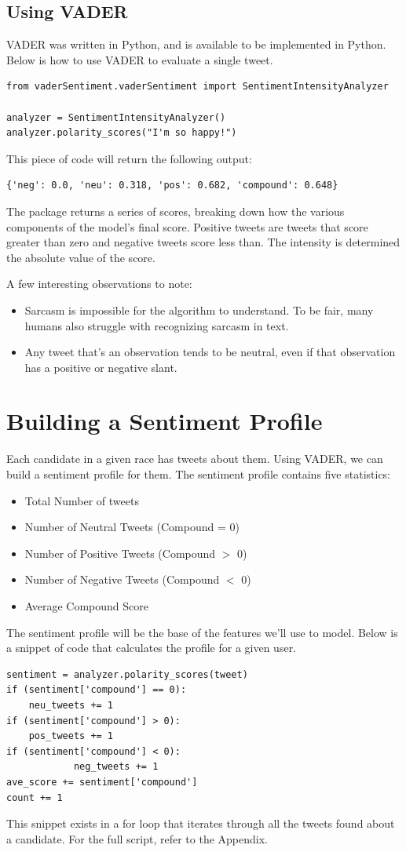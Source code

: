 \documentclass[11pt, twoside, reqno]{book}
\begin{document}
\subsection{Using VADER}
\hspace{0.2in}VADER was written in Python, and is available to be implemented in Python. Below is how to use VADER to evaluate a single tweet. 
\begin{verbatim}
from vaderSentiment.vaderSentiment import SentimentIntensityAnalyzer

analyzer = SentimentIntensityAnalyzer()
analyzer.polarity_scores("I'm so happy!")
\end{verbatim}
This piece of code will return the following output:
\begin{verbatim}
{'neg': 0.0, 'neu': 0.318, 'pos': 0.682, 'compound': 0.648}
\end{verbatim}
The package returns a series of scores, breaking down how the various components of the model's final score. Positive tweets are tweets that score greater than zero and negative tweets score less than. The intensity is determined the absolute value of the score. 

A few interesting observations to note:
\begin{itemize}
	\item Sarcasm is impossible for the algorithm to understand. To be fair, many humans also struggle with recognizing sarcasm in text.
	\item Any tweet that's an observation tends to be neutral, even if that observation has a positive or negative slant. 
\end{itemize}

\section{Building a Sentiment Profile}
Each candidate in a given race has tweets about them. Using VADER, we can build a sentiment profile for them. The sentiment profile contains five statistics:
\begin{itemize}
	\item Total Number of tweets
	\item Number of Neutral Tweets (Compound = 0)
	\item Number of Positive Tweets (Compound $>$ 0)
	\item Number of Negative Tweets (Compound $<$ 0)
	\item Average Compound Score
\end{itemize}
The sentiment profile will be the base of the features we'll use to model. Below is a snippet of code that calculates the profile for a given user.
\begin{verbatim}
sentiment = analyzer.polarity_scores(tweet) 
if (sentiment['compound'] == 0):        
	neu_tweets += 1          
if (sentiment['compound'] > 0):        
	pos_tweets += 1            
if (sentiment['compound'] < 0):
        	neg_tweets += 1
ave_score += sentiment['compound']
count += 1
\end{verbatim}
This snippet exists in a for loop that iterates through all the tweets found about a candidate. For the full script, refer to the Appendix. 
\end{document}

